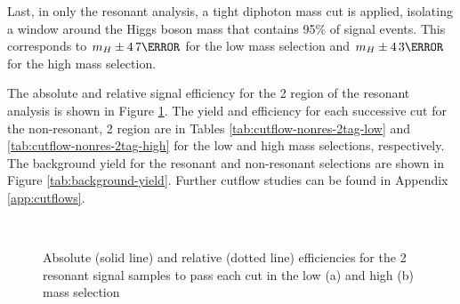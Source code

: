 Last, in only the resonant analysis, a tight diphoton mass cut is applied, isolating a window around the Higgs boson mass that contains 95\% of signal events. This corresponds to $m_H \pm \unit{4.7}{\GeV}$ for the low mass selection and $m_H \pm \unit{4.3}{\GeV}$ for the high mass selection.

The absolute and relative signal efficiency for the 2 \btag region of the resonant analysis is shown in Figure \ref{fig:resonant-cutflow}. The yield and efficiency for each successive cut for the non-resonant, 2 \btag region are in Tables \ref{tab:cutflow-nonres-2tag-low} and \ref{tab:cutflow-nonres-2tag-high} for the low and high mass selections, respectively. The background yield for the resonant and non-resonant selections are shown in Figure \ref{tab:background-yield}. Further cutflow studies can be found in Appendix \ref{app:cutflows}.

\begin{figure}[!h]
  \centering
  \\
  \caption[Absolute and relative efficiencies for the 2 \btag category, high mass selection]{Absolute (solid line) and relative (dotted line) efficiencies for the 2 \btag resonant signal samples to pass each cut in the low (a) and high (b) mass selection}
  \label{fig:resonant-cutflow}
\end{figure}


